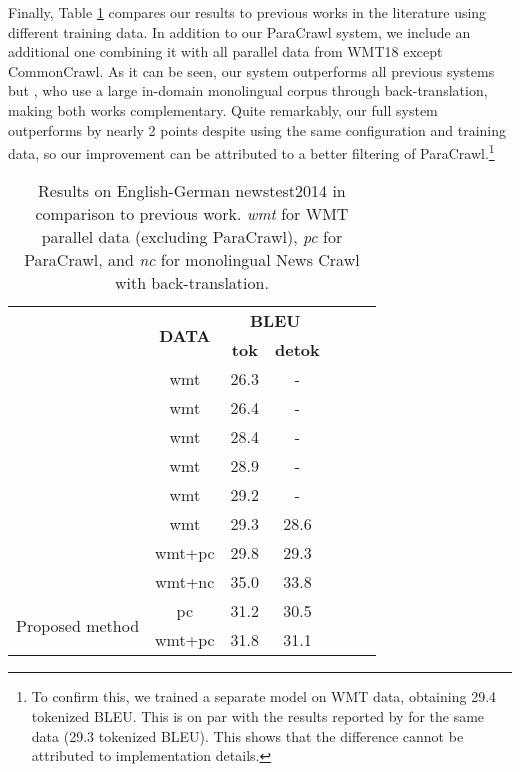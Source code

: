 \documentclass[11pt,a4paper]{article}
\begin{document}
Finally, Table \ref{tab:results_mt_sota} compares our results to previous works in the literature using different training data. In addition to our ParaCrawl system, we include an additional one combining it with all parallel data from WMT18 except CommonCrawl. As it can be seen, our system outperforms all previous systems but \citet{edunov:2018:emnlp_backtrans}, who use a large in-domain monolingual corpus through back-translation, making both works complementary. Quite remarkably, our full system outperforms \citet{Ott:2018:wmt_scale_nmt} by nearly 2 points despite using the same configuration and training data, so our improvement can be attributed to a better filtering of ParaCrawl.\footnote{To confirm this, we trained a separate model on WMT data, obtaining 29.4 tokenized BLEU. This is on par with the results reported by \citet{Ott:2018:wmt_scale_nmt} for the same data (29.3 tokenized BLEU). This shows that the difference cannot be attributed to implementation details.}


\begin{table}[t]
\begin{small}
\begin{center}
  \begin{tabular}{lccclll}
    \toprule
    & \multirow{2}{*}{\bf DATA} & \multicolumn{2}{c}{\bf BLEU} \\
    \cmidrule{3-4}
    & & \multicolumn{1}{c}{\bf tok} & \multicolumn{1}{c}{\bf detok} \\
    \midrule
    \citet{wu2016google} & wmt & 26.3 & - \\
    \citet{Gehring:2017:fairseq_icml} & wmt & 26.4 & - \\
    \citet{vaswani2017attention} & wmt & 28.4 & - \\
    \citet{ahmed2017weighted} & wmt & 28.9 & - \\
    \citet{shaw:2018:naacl_selfattn} & wmt & 29.2 & - \\
    \citet{Ott:2018:wmt_scale_nmt} & wmt & 29.3 & 28.6 \\
    \citet{Ott:2018:wmt_scale_nmt} & wmt+pc & 29.8 & 29.3 \\
    \citet{edunov:2018:emnlp_backtrans} & wmt+nc & 35.0 & 33.8 \\
    \midrule
    \multirow{2}{*}{Proposed method} &  pc & 31.2 & 30.5 \\
    & wmt+pc & 31.8 & 31.1 \\
    \bottomrule
  \end{tabular}
\end{center}
\end{small}
\caption{Results on English-German newstest2014 in comparison to previous work. \textit{wmt} for WMT parallel data (excluding ParaCrawl), \textit{pc} for ParaCrawl, and \textit{nc} for monolingual News Crawl with back-translation.}
\label{tab:results_mt_sota}
\end{table}
\end{document}
